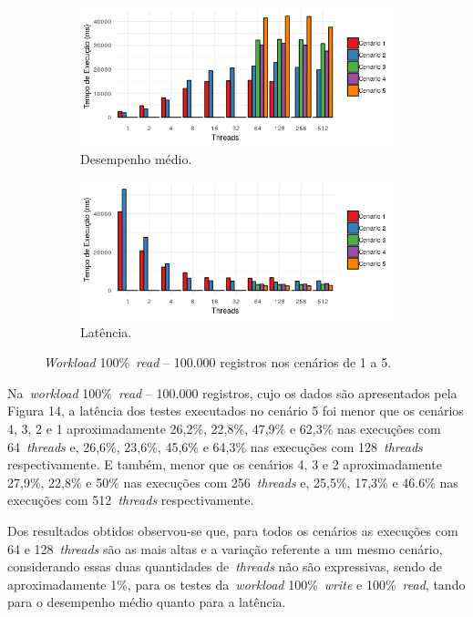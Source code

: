 \documentclass[12pt]{article}
\begin{document}
\begin{figure}
    \centering
    \begin{subfigure}[b]{0.49\textwidth}   
        \centering 
        \includegraphics[width=\textwidth]{images/figura13}
        \caption{Desempenho médio.}
        \label{figura13}
    \end{subfigure}
    \begin{subfigure}[b]{0.49\textwidth}   
        \centering 
        \includegraphics[width=\textwidth]{images/figura14}
        \caption{Latência.}
        \label{figura14}
    \end{subfigure}
    \caption{\emph{Workload} 100\%~\emph{read} -- 100.000 registros nos cenários de 1 a 5.}
\end{figure}

Na~\emph{workload} 100\%~\emph{read} -- 100.000 registros, cujo os dados são apresentados pela Figura 14, a latência dos testes executados no cenário 5 foi menor que os cenários 4, 3, 2 e 1 aproximadamente 26,2\%, 22,8\%, 47,9\% e 62,3\% nas execuções com 64~\emph{threads} e, 26,6\%, 23,6\%, 45,6\% e 64,3\% nas execuções com 128~\emph{threads} respectivamente. 
E também, menor que os cenários 4, 3 e 2 aproximadamente 27,9\%, 22,8\% e 50\% nas execuções com 256~\emph{threads} e, 25,5\%, 17,3\% e 46.6\% nas execuções com 512~\emph{threads} respectivamente.

Dos resultados obtidos observou-se que, para todos os cenários as execuções com 64 e 128~\emph{threads} são as mais altas e a variação referente a um mesmo cenário, considerando essas duas quantidades de~\emph{threads} não são expressivas, sendo de aproximadamente 1\%, para os testes da~\emph{workload} 100\%~\emph{write} e 100\%~\emph{read}, tando para o desempenho médio
quanto para a latência.
\end{document}
